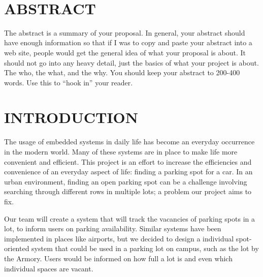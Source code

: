 \documentclass[12pt]{article}
\begin{document}
\begin{titlepage}
\begin{minipage}{0.8\textwidth}
\begin{flushleft}
		\end{flushleft}
	\end{minipage}\\[2 cm]
	
	\vfill
	
\end{titlepage}

\tableofcontents
\pagebreak

\section{ABSTRACT}
The abstract is a summary of your proposal. In general, your abstract should have enough information so that if I was to copy and paste your abstract into a web site, people would get the general idea of what your proposal is about. It should not go into any heavy detail, just the basics of what your project is about. The who, the what, and the why. You should keep your abstract to 200-400 words. Use this to ``hook in'' your reader.

\section{INTRODUCTION}

The usage of embedded systems in daily life has become an everyday occurrence in the modern world. Many of these systems are in place to make life more convenient and efficient. This project is an effort to increase the efficiencies and convenience of an everyday aspect of life: finding a parking spot for a car. In an urban environment, finding an open parking spot can be a challenge involving searching through different rows in multiple lots; a problem our project aims to fix.

Our team will create a system that will track the vacancies of parking spots in a lot, to inform users on parking availability. Similar systems have been implemented in places like airports, but we decided to design a individual spot-oriented system that could be used in a parking lot on campus, such as the lot by the Armory. Users would be informed on how full a lot is and even which individual spaces are vacant.
\end{document}
